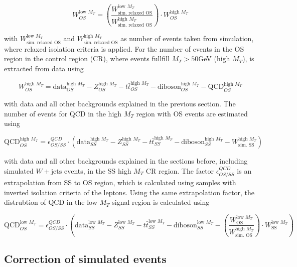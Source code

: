 \begin{equation}
	W^{\text{low } M_T}_{OS} = (\frac{W^{\text{low } M_T}_{\text{sim. relaxed OS}}}{W^{\text{high } M_T}_{\text{sim. relaxed OS}}}) \cdot W^{\text{high } M_T}_{OS}
\end{equation}

with $W^{\text{low } M_T}_{\text{sim. relaxed OS}}$ and $W^{\text{high } M_T}_{\text{sim. relaxed OS}}$ as number of events taken from simulation, where relaxed isolation criteria is applied. For the number of events in the OS region in the control region (CR), where events fullfill $M_T > 50$GeV (high $M_T$), is extracted from data using 

\begin{equation}
	W^{\text{high } M_T}_{OS} = \text{data}^{\text{high } M_T}_{OS} - Z^{\text{high } M_T}_{OS} - t\bar{t}^{\text{high } M_T}_{OS} - \text{diboson}^{\text{high } M_T}_{OS} - \text{QCD}^{\text{high } M_T}_{OS}
\end{equation}

with data and all other backgrounds explained in the previous section. The number of events for QCD in the high $M_T$ region with OS events are estimated using

\begin{equation}
\text{QCD}^{\text{high } M_T}_{OS} = \epsilon^{QCD}_{OS/SS} \cdot (\text{data}^{\text{high } M_T}_{SS} - Z^{\text{high } M_T}_{SS} - t\bar{t}^{\text{high } M_T}_{SS} - \text{diboson}^{\text{high } M_T}_{SS} - W^{\text{high } M_T}_{\text{sim. SS}})
\end{equation}

with data and all other backgrounds explained in the sections before, including simulated $W + \text{jets}$ events, in the SS high $M_T$ CR region. The factor $\epsilon^{QCD}_{OS/SS}$ is an extrapolation from SS to OS region, which is calculated using samples with inverted isolation criteria of the leptons. Using the same extrapolation factor, the distrubtion of QCD in the low $M_T$ signal region is calculated using 

\begin{equation}
	\text{QCD}^{\text{low } M_T}_{OS} = \epsilon^{QCD}_{OS/SS} \cdot (\text{data}^{\text{low } M_T}_{SS} - Z^{\text{low } M_T}_{SS} - t\bar{t}^{\text{low } M_T}_{SS} - \text{diboson}^{\text{low } M_T}_{SS} -  (\frac{W^{\text{low } M_T}_{\text{OS}}}{W^{\text{high } M_T}_{\text{sim. OS}}}) \cdot W^{\text{low } M_T}_{\text{SS}})
\end{equation}


\subsection{Correction of simulated events}

